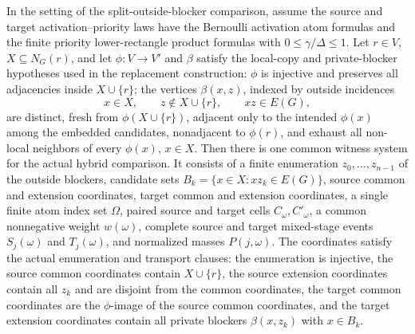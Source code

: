 \begin{helper}
In the setting of the split-outside-blocker comparison, assume the source and
target activation--priority laws have the Bernoulli activation atom formulas
and the finite priority lower-rectangle product formulas with
\(0\le \gamma/\Delta\le 1\).  Let \(r\in V\), \(X\subseteq N_G(r)\), and let
\(\phi:V\to V'\) and \(\beta\) satisfy the local-copy and private-blocker
hypotheses used in the replacement construction: \(\phi\) is injective and
preserves all adjacencies inside \(X\cup\{r\}\); the vertices
\(\beta(x,z)\), indexed by outside incidences
\[
  x\in X,\qquad z\notin X\cup\{r\},\qquad xz\in E(G),
\]
are distinct, fresh from \(\phi(X\cup\{r\})\), adjacent only to the intended
\(\phi(x)\) among the embedded candidates, nonadjacent to \(\phi(r)\), and
exhaust all non-local neighbors of every \(\phi(x)\), \(x\in X\).
Then there is one common witness system for the actual hybrid comparison.  It
consists of a finite enumeration \(z_0,\ldots,z_{n-1}\) of the outside
blockers, candidate sets \(B_k=\{x\in X:xz_k\in E(G)\}\), source common and
extension coordinates, target common and extension coordinates, a single
finite atom index set \(\Omega\), paired source and target cells
\(C_\omega,C'_\omega\), a common nonnegative weight \(w(\omega)\), complete
source and target mixed-stage events \(S_j(\omega)\) and \(T_j(\omega)\), and
normalized masses \(P(j,\omega)\).  The coordinates satisfy the actual
enumeration and transport clauses: the enumeration is injective, the source
common coordinates contain
\(X\cup\{r\}\), the source extension coordinates contain all \(z_k\) and are
disjoint from the common coordinates, the target common coordinates are the
\(\phi\)-image of the source common coordinates, and the target extension
coordinates contain all private blockers \(\beta(x,z_k)\) with \(x\in B_k\).


\end{helper}
